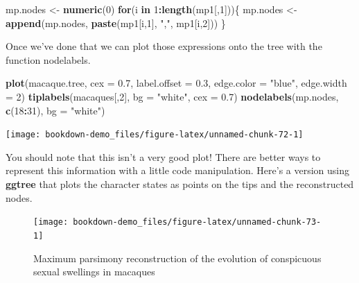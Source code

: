 \documentclass[
]{book}
\newenvironment{Shaded}{\begin{snugshade}}{\end{snugshade}}
\newcommand{\ControlFlowTok}[1]{\textcolor[rgb]{0.13,0.29,0.53}{\textbf{#1}}}
\newcommand{\DataTypeTok}[1]{\textcolor[rgb]{0.13,0.29,0.53}{#1}}
\newcommand{\DecValTok}[1]{\textcolor[rgb]{0.00,0.00,0.81}{#1}}
\newcommand{\FloatTok}[1]{\textcolor[rgb]{0.00,0.00,0.81}{#1}}
\newcommand{\KeywordTok}[1]{\textcolor[rgb]{0.13,0.29,0.53}{\textbf{#1}}}
\newcommand{\NormalTok}[1]{#1}
\newcommand{\OperatorTok}[1]{\textcolor[rgb]{0.81,0.36,0.00}{\textbf{#1}}}
\newcommand{\StringTok}[1]{\textcolor[rgb]{0.31,0.60,0.02}{#1}}
\begin{document}
\begin{Shaded}
\begin{Highlighting}[]
\NormalTok{mp.nodes \textless{}{-}}\StringTok{ }\KeywordTok{numeric}\NormalTok{(}\DecValTok{0}\NormalTok{)}
\ControlFlowTok{for}\NormalTok{(i }\ControlFlowTok{in} \DecValTok{1}\OperatorTok{:}\KeywordTok{length}\NormalTok{(mp1[,}\DecValTok{1}\NormalTok{]))\{}
\NormalTok{  mp.nodes \textless{}{-}}\StringTok{ }\KeywordTok{append}\NormalTok{(mp.nodes, }\KeywordTok{paste}\NormalTok{(mp1[i,}\DecValTok{1}\NormalTok{], }\StringTok{","}\NormalTok{, mp1[i,}\DecValTok{2}\NormalTok{]))}
\NormalTok{\}}
\end{Highlighting}
\end{Shaded}

Once we've done that we can plot those expressions onto the tree with the function nodelabels.

\begin{Shaded}
\begin{Highlighting}[]
\KeywordTok{plot}\NormalTok{(macaque.tree, }\DataTypeTok{cex =} \FloatTok{0.7}\NormalTok{, }\DataTypeTok{label.offset =} \FloatTok{0.3}\NormalTok{,}
     \DataTypeTok{edge.color =} \StringTok{"blue"}\NormalTok{, }\DataTypeTok{edge.width =} \DecValTok{2}\NormalTok{)      }
\KeywordTok{tiplabels}\NormalTok{(macaques[,}\DecValTok{2}\NormalTok{], }\DataTypeTok{bg =} \StringTok{"white"}\NormalTok{, }\DataTypeTok{cex =} \FloatTok{0.7}\NormalTok{)}
\KeywordTok{nodelabels}\NormalTok{(mp.nodes, }\KeywordTok{c}\NormalTok{(}\DecValTok{18}\OperatorTok{:}\DecValTok{31}\NormalTok{), }\DataTypeTok{bg =} \StringTok{"white"}\NormalTok{)}
\end{Highlighting}
\end{Shaded}

\begin{center}\texttt{[image: bookdown-demo\_files/figure-latex/unnamed-chunk-72-1]} \end{center}

You should note that this isn't a very good plot! There are better ways to represent this information with a little code manipulation. Here's a version using \textbf{ggtree} that plots the character states as points on the tips and the reconstructed nodes.

\begin{figure}[H]

{\centering \texttt{[image: bookdown-demo\_files/figure-latex/unnamed-chunk-73-1]} 

}

\caption{Maximum parsimony reconstruction of the evolution of conspicuous sexual swellings in macaques}\label{fig:unnamed-chunk-73}
\end{figure}
\end{document}
